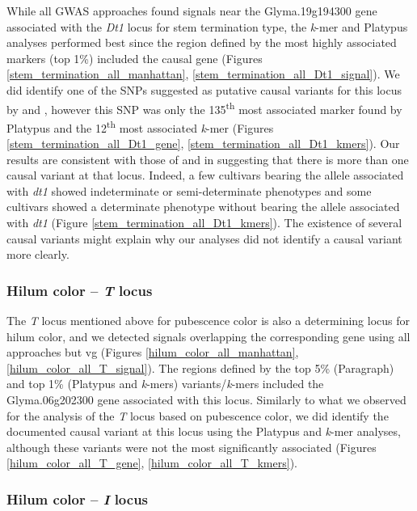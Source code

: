 While all GWAS approaches found signals near the Glyma.19g194300 gene
associated with the \textit{Dt1} locus for stem termination type, the
\textit{k}-mer and Platypus analyses performed best since the region defined by the most highly associated markers
(top 1\%) included the causal gene (Figures
\ref{stem_termination_all_manhattan}, \ref{stem_termination_all_Dt1_signal}).
We did identify one of the SNPs suggested as putative causal variants for this
locus by \cite{tian2010} and \cite{liu2010}, however this SNP was only the
135\textsuperscript{th} most associated marker found by Platypus and the
12\textsuperscript{th} most associated \emph{k}-mer (Figures
\ref{stem_termination_all_Dt1_gene}, \ref{stem_termination_all_Dt1_kmers}).
Our results are consistent with those of \cite{liu2010} and \cite{tian2010} in
suggesting that there is more than one causal variant at that locus. Indeed, a
few cultivars bearing the allele associated with \emph{dt1} showed
indeterminate or semi-determinate phenotypes and some cultivars showed a
determinate phenotype without bearing the allele associated with \emph{dt1}
(Figure \ref{stem_termination_all_Dt1_kmers}). The existence of several causal
variants might explain why our analyses did not identify a causal variant more
clearly.

\subsubsection*{Hilum color -- \textit{T} locus}
\label{sv-gwas-main-results-hilum-color-t}

The \textit{T} locus mentioned above for pubescence color is also a determining
locus for hilum color, and we detected signals overlapping the corresponding gene
using all approaches but vg (Figures \ref{hilum_color_all_manhattan},
\ref{hilum_color_all_T_signal}). The regions defined by the top 5\% (Paragraph)
and top 1\% (Platypus and \textit{k}-mers) variants/\textit{k}-mers included
the Glyma.06g202300 gene associated with this locus. Similarly to what we
observed for the analysis of the \textit{T} locus based on pubescence color, we
did identify the documented causal variant at this locus using the Platypus and
\textit{k}-mer analyses, although these variants were not the most
significantly associated (Figures \ref{hilum_color_all_T_gene},
\ref{hilum_color_all_T_kmers}).

\subsubsection*{Hilum color -- \textit{I} locus}
\label{sv-gwas-main-results-hilum-color-i}

